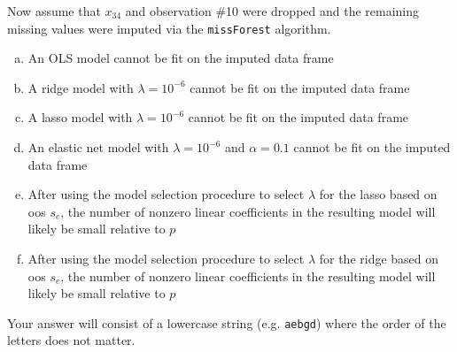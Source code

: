 \documentclass[12pt,landscape]{article}
\newcommand{\instr}{\small Your answer will consist of a lowercase string (e.g. \texttt{aebgd}) where the order of the letters does not matter. \normalsize}
\begin{document}
\noindent Now assume that $x_{34}$ and observation \#10 were dropped and the remaining missing values were imputed via the \texttt{missForest} algorithm.

\vspace{-0.2cm}\benum{}

\begin{enumerate}[(a)]
\item An OLS model cannot be fit on the imputed data frame
\item A ridge model with $\lambda = 10^{-6}$ cannot be fit on the imputed data frame
\item A lasso model with $\lambda = 10^{-6}$ cannot be fit on the imputed data frame
\item An elastic net model with $\lambda = 10^{-6}$ and $\alpha = 0.1$ cannot be fit on the imputed data frame
\item After using the model selection procedure to select $\lambda$ for the lasso based on oos $s_e$, the number of nonzero linear coefficients in the resulting model will likely be small relative to $p$
\item After using the model selection procedure to select $\lambda$ for the ridge based on oos $s_e$, the number of nonzero linear coefficients in the resulting model will likely be small relative to $p$
\end{enumerate}
\eenum\instr\pagebreak
\end{document}
